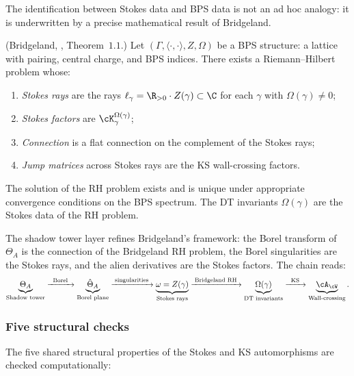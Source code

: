 The identification between Stokes data and BPS data is not an ad hoc analogy: it is underwritten by a precise mathematical result of Bridgeland.

\begin{theorem}[Bridgeland, 2019]
\label{thm:bridgeland-rh}
\textup{(}Bridgeland, \textup{\cite{Bridgeland2019RH}}, Theorem~$1.1$.\textup{)} Let $(\Gamma, \langle \cdot, \cdot \rangle, Z, \Omega)$ be a BPS structure: a lattice with pairing, central charge, and BPS indices. There exists a Riemann--Hilbert problem whose:
\begin{enumerate}[label=\textup{(\roman*)}]
 \item \emph{Stokes rays} are the rays $\ell_\gamma = \R_{>0} \cdot Z(\gamma) \subset \C$ for each $\gamma$ with $\Omega(\gamma) \neq 0$;
 \item \emph{Stokes factors} are $\cK_\gamma^{\Omega(\gamma)}$;
 \item \emph{Connection} is a flat connection on the complement of the Stokes rays;
 \item \emph{Jump matrices} across Stokes rays are the KS wall-crossing factors.
\end{enumerate}
The solution of the RH problem exists and is unique under appropriate convergence conditions on the BPS spectrum. The DT invariants $\Omega(\gamma)$ are the Stokes data of the RH problem.
\end{theorem}

\noindent The shadow tower layer refines Bridgeland's framework: the Borel transform of $\Theta_A$ is the connection of the Bridgeland RH problem, the Borel singularities are the Stokes rays, and the alien derivatives are the Stokes factors. The chain reads:
\begin{equation}
\label{eq:identification-chain}
 \underbrace{\Theta_A}_{\text{Shadow tower}} \xrightarrow{\;\;\text{Borel}\;\;} \underbrace{\hat{\Theta}_A}_{\text{Borel plane}} \xrightarrow{\;\text{singularities}\;} \underbrace{\omega = Z(\gamma)}_{\text{Stokes rays}} \xrightarrow{\;\text{Bridgeland RH}\;} \underbrace{\Omega(\gamma)}_{\text{DT invariants}} \xrightarrow{\;\;\text{KS}\;\;} \underbrace{\cA_\cW}_{\text{Wall-crossing}}.
\end{equation}

\subsubsection{Five structural checks}
\label{subsubsec:five-checks}

The five shared structural properties of the Stokes and KS automorphisms are checked computationally:

